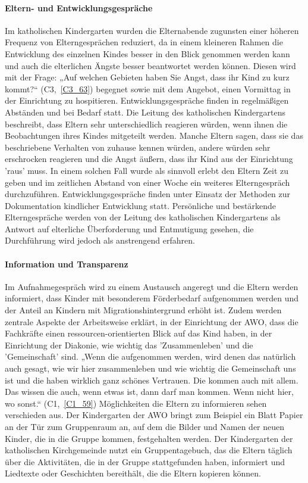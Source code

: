 \paragraph{Eltern- und Entwicklungsgespräche}
Im katholischen Kindergarten wurden die Elternabende zugunsten einer höheren Frequenz von Elterngesprächen reduziert, da in einem kleineren Rahmen die Entwicklung des einzelnen Kindes besser in den Blick genommen werden kann und auch die elterlichen Ängste besser beantwortet werden können. Diesen wird mit der Frage: „Auf welchen Gebieten haben Sie Angst, dass ihr Kind zu kurz kommt?“ (C3,~\ref{C3_63}) begegnet sowie mit dem Angebot, einen Vormittag in der Einrichtung zu hospitieren. 
Entwicklungsgespräche finden in regelmäßigen Abständen und bei Bedarf statt. Die Leitung des katholischen Kindergartens beschreibt, dass Eltern sehr unterschiedlich reagieren würden, wenn ihnen die Beobachtungen ihres Kindes mitgeteilt werden. 
Manche Eltern sagen, dass sie das beschriebene Verhalten von zuhause kennen würden, andere würden sehr erschrocken reagieren und die Angst äußern, dass ihr Kind aus der Einrichtung 'raus' muss. In einem solchen Fall wurde als sinnvoll erlebt den Eltern Zeit zu geben und im zeitlichen Abstand von einer Woche ein weiteres Elterngespräch durchzuführen. Entwicklungsgespräche finden unter Einsatz der Methoden zur Dokumentation kindlicher Entwicklung statt. 
Persönliche und bestärkende Elterngespräche werden von der Leitung des katholischen Kindergartens als Antwort auf elterliche Überforderung und Entmutigung gesehen, die Durchführung wird jedoch als anstrengend erfahren. 

\paragraph{Information und Transparenz}
Im Aufnahmegespräch wird zu einem Austausch angeregt und die Eltern werden informiert, dass Kinder mit besonderem Förderbedarf aufgenommen werden und der Anteil an Kindern mit Migrationshintergrund erhöht ist. Zudem werden zentrale Aspekte der Arbeitsweise erklärt, in der Einrichtung der AWO, dass die Fachkräfte einen ressourcen-orientierten Blick auf das Kind haben, in der Einrichtung der Diakonie, wie wichtig das 'Zusammenleben' und die 'Gemeinschaft' sind. „Wenn die aufgenommen werden, wird denen das natürlich auch gesagt, wie wir hier zusammenleben und wie wichtig die Gemeinschaft uns ist und die haben wirklich ganz schönes Vertrauen. Die kommen auch mit allem. Das wissen die auch, wenn etwas ist, dann darf man kommen. Wenn nicht hier, wo sonst.“ (C1,~\ref{C1_59})
Möglichkeiten die Eltern zu informieren sehen verschieden aus. Der Kindergarten der AWO bringt zum Beispiel ein Blatt Papier an der Tür zum Gruppenraum an, auf dem die Bilder und Namen der neuen Kinder, die in die Gruppe kommen, festgehalten werden.
Der Kindergarten der katholischen Kirchgemeinde nutzt ein Gruppentagebuch, das die Eltern täglich über die Aktivitäten, die in der Gruppe stattgefunden haben, informiert und Liedtexte oder Geschichten bereithält, die die Eltern kopieren können. 

